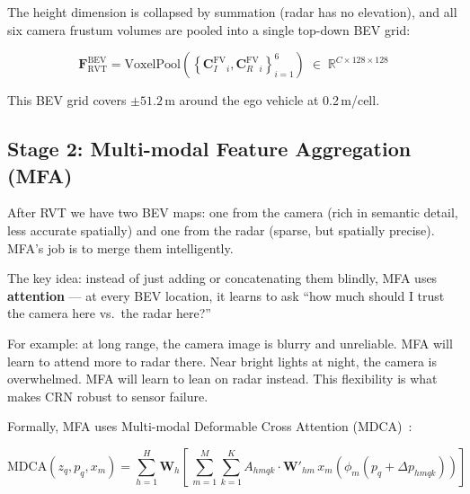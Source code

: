 \documentclass[12pt, a4paper]{article}
\newcommand{\bev}{\mathrm{BEV}}
\newcommand{\fv}{\mathrm{FV}}
\newcommand{\CI}{\mathbf{C}_{I}}
\newcommand{\CR}{\mathbf{C}_{R}}
\newcommand{\Fbev}{\mathbf{F}^{\bev}}
\newcommand{\R}{\mathbb{R}}
\theoremstyle{definition}
\begin{document}
The height dimension is collapsed by summation (radar has no elevation), and
all six camera frustum volumes are pooled into a single top-down BEV grid:

\begin{equation}
  \Fbev_\mathrm{RVT}
  = \mathrm{VoxelPool}\!\left(\left\{\CI^\fv_i, \CR^\fv_i\right\}_{i=1}^{6}\right)
  \;\in\; \R^{C\times 128\times 128}
  \label{eq:bev_pool}
\end{equation}

This BEV grid covers $\pm 51.2$\,m around the ego vehicle at 0.2\,m/cell.

\subsection{Stage 2: Multi-modal Feature Aggregation (MFA)}

\begin{plainbox}
After RVT we have two BEV maps: one from the camera (rich in semantic detail,
less accurate spatially) and one from the radar (sparse, but spatially precise).
MFA's job is to merge them intelligently.

The key idea: instead of just adding or concatenating them blindly, MFA uses
\textbf{attention} --- at every BEV location, it learns to ask
``how much should I trust the camera here vs.\ the radar here?''

For example: at long range, the camera image is blurry and unreliable.
MFA will learn to attend more to radar there.
Near bright lights at night, the camera is overwhelmed.
MFA will learn to lean on radar instead.
This flexibility is what makes CRN robust to sensor failure.
\end{plainbox}

Formally, MFA uses Multi-modal Deformable Cross Attention
(MDCA)~\cite{zhu2021deformable}:

\begin{equation}
  \mathrm{MDCA}(z_q, p_q, x_m)
  = \sum_{h=1}^{H} \mathbf{W}_h
    \!\left[\,\sum_{m=1}^{M} \sum_{k=1}^{K}
      A_{hmqk}\cdot \mathbf{W}'_{hm}\,x_m\!\left(\phi_m(p_q + \Delta p_{hmqk})\right)
    \right]
  \label{eq:mdca}
\end{equation}
\end{document}
